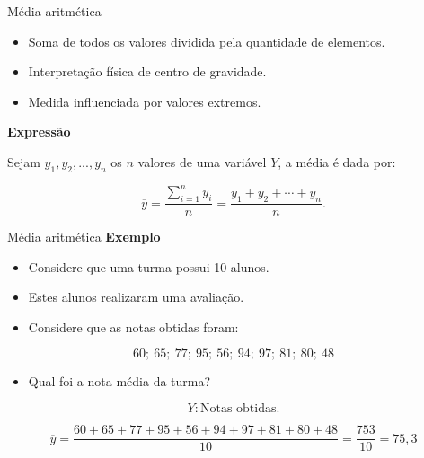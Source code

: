 \documentclass[
  ignorenonframetext,
  serif,
  professionalfont,
  usenames,
  dvipsnames,
  aspectratio = 169]{beamer}
\providecommand{\tightlist}{%
  \setlength{\itemsep}{0pt}\setlength{\parskip}{0pt}}
\renewcommand{\tightlist}{%
  \setlength{\itemsep}{0\baselineskip}
  \setlength{\parskip}{0.25\baselineskip}
}
\begin{document}
\begin{frame}{Média aritmética}
\label{muxe9dia-aritmuxe9tica}
\begin{itemize}
\tightlist
\item
  Soma de todos os valores dividida pela quantidade de elementos.
\item
  Interpretação física de centro de gravidade.
\item
  Medida influenciada por valores extremos.
\end{itemize}

\textbf{Expressão}

Sejam \(y_1, y_2,...,y_n\) os \(n\) valores de uma variável \(Y\), a
média é dada por:

\[
      \overline{y} = \dfrac{\sum_{i = 1}^{n} y_i}{n} = \frac{y_1 + y_2 + \cdots + y_n}{n}.
\]
\end{frame}

\begin{frame}{Média aritmética}
\label{muxe9dia-aritmuxe9tica-1}
\textbf{Exemplo}

\begin{itemize}
\item
  Considere que uma turma possui 10 alunos.
\item
  Estes alunos realizaram uma avaliação.
\item
  Considere que as notas obtidas foram:
\end{itemize}

\[60;\ 65;\ 77;\ 95;\ 56;\ 94;\ 97;\ 81;\ 80;\ 48\]

\begin{itemize}
\tightlist
\item
  Qual foi a nota média da turma?
\end{itemize}

\[Y: \text{Notas obtidas.}\]

\[
\overline{y}  = \frac{60+65+77+95+56+94+97+81+80+48}{10} = \frac{753}{10} = 75,3
\]
\end{frame}
\end{document}
